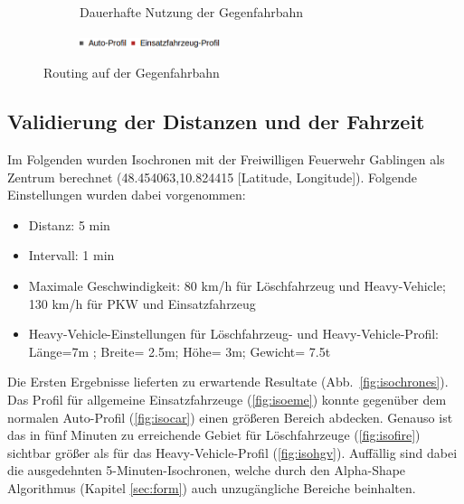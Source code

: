 \begin{figure}[htb]
\begin{subfigure}{0.49\textwidth}
\caption{Dauerhafte Nutzung der Gegenfahrbahn}
\label{fig:oppositelane}
\end{subfigure}
\begin{subfigure}{0.90\textwidth}
\centering
\includegraphics[width = 0.45\textwidth]{../media/legend4.png} \\
\end{subfigure}
\caption{Routing auf der Gegenfahrbahn}
\label{fig:opposite}
\end{figure}

\newpage
\subsection{Validierung der Distanzen und der Fahrzeit}

Im Folgenden wurden Isochronen mit der Freiwilligen Feuerwehr Gablingen als Zentrum berechnet (48.454063,10.824415 [Latitude, Longitude]).
Folgende Einstellungen wurden dabei vorgenommen:
\sloppy
\begin{itemize}
\item Distanz: 5 min
\item Intervall: 1 min
\item Maximale Geschwindigkeit: 80 km/h für Löschfahrzeug und Heavy-Vehicle; 130 km/h für PKW und Einsatzfahrzeug
\item Heavy-Vehicle-Einstellungen für Löschfahrzeug- und Heavy-Vehicle-Profil: Länge=7m ; Breite= 2.5m; Höhe= 3m; Gewicht= 7.5t
\end{itemize}
\fussy

Die Ersten Ergebnisse lieferten zu erwartende Resultate (Abb.~\ref{fig:isochrones}).
Das Profil für allgemeine Einsatzfahrzeuge (\ref{fig:isoeme}) konnte gegenüber dem normalen Auto-Profil (\ref{fig:isocar}) einen größeren Bereich abdecken.
Genauso ist das in fünf Minuten zu erreichende Gebiet für Löschfahrzeuge (\ref{fig:isofire}) sichtbar größer als für das Heavy-Vehicle-Profil (\ref{fig:isohgv}).
Auffällig sind dabei die ausgedehnten 5-Minuten-Isochronen, welche durch den Alpha-Shape Algorithmus (Kapitel \ref{sec:form}) auch unzugängliche Bereiche beinhalten.

